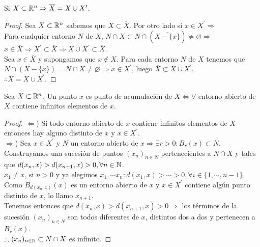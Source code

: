 \begin{prop}
  Si $X \subset \mathbb{R}^n \Rightarrow \overline{X} = X \cup X^{\prime}$.
  \begin{proof}
    Sea $X \subset \mathbb{R}^n$ sabemos que $X \subset \overline{X}$. Por otro lado si $x \in X^{\prime} \Rightarrow$ \\
    Para cualquier entorno $N$ de $X$, $N \cap X \subset N \cap (\overline{X - \{x\}}) \neq \varnothing \Rightarrow$ \\
    $x \in \overline{X} \Rightarrow X^{\prime} \subset \overline{X} \Rightarrow X \cup X^{\prime} \subset \overline{X}$. \\

    Sea $x \in \overline{X}$ y supongamos que $x \notin X$. Para cada entorno $N$ de $X$ tenemos que $N \cap (X - \{x\}) = N \cap X \neq \varnothing \Rightarrow x \in X^{\prime}$, luego $\overline{X} \subset X \cup X^{\prime}$. \\
    $\therefore \overline{X} = X \cup X^{\prime}$.
  \end{proof}
\end{prop}

\begin{prop}
  Sea $X \subset \mathbb{R}^n$. Un punto $x$ es punto de acumulación de $X \iff \forall$ entorno abierto de $X$ contiene infinitos elementos de $x$.

  \begin{proof}
    $\Leftarrow$) Si todo entorno abierto de $x$ contiene infinitos elementos de $X$ entonces hay alguno distinto de $x$ y $x \in X^{\prime}$. \\
    $\Rightarrow$) Sea $x \in X^{\prime}$ y $N$ un entorno abierto de $x \Rightarrow \exists r > 0 : B_r(x) \subset N$. \\
    Construyamos una sucesión de puntos $(x_n)_{n \in N}$ pertenecientes a $N \cap X$ y tales que $d(x_n, x) > d(x_{n+1}, x) > 0, \forall n \in \mathbb{N}$. \\
    $x_1 \neq x$, si $n > 0$ y ya elegimos $x_1, \cdots x_n : d(x_1, x) > \cdots > 0, \forall i \in \{1, \cdots, n-1\}$. Como $B_{d(x_n, x)}(x)$ es un entorno abierto de $x$ y $x \in X^{\prime}$ contiene algún punto distinto de $x$, lo llamo $x_{n+1}$. \\
    Tenemos entonces que $d(x_n, x) > d(x_{n+1}, x) > 0 \Rightarrow$ los términos de la sucesión $(x_n)_{n \in N}$ son todos diferentes de $x$, distintos dos a dos y pertenecen a $B_r(x)$. \\
    $\therefore (x_n)_{n \in \mathbb{N}} \subset N \cap X$ es infinito.
  \end{proof}
\end{prop}

